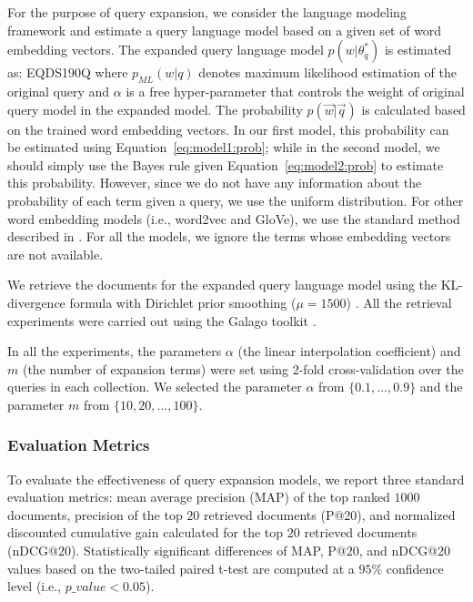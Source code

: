 \documentclass[sigconf]{acmart}
\begin{document}
For the purpose of query expansion, we consider the language modeling framework \cite{Ponte:1998} and estimate a query language model based on a given set of word embedding vectors. The expanded query language model $p(w | \theta^*_q)$ is estimated as:
EQDS190Q
where $p_{ML}(w | q)$ denotes maximum likelihood estimation of the original query and $\alpha$ is a free hyper-parameter that controls the weight of original query model in the expanded model. The probability $p(\vec{w} | \vec{q})$ is calculated based on the trained word embedding vectors. In our first model, this probability can be estimated using {Equation}~\eqref{eq:model1:prob}; while in the second model, we should simply use the Bayes rule given {Equation}~\eqref{eq:model2:prob} to estimate this probability. However, since we do not have any information about the probability of each term given a query, we use the uniform distribution. For other word embedding models (i.e., word2vec and GloVe), we use the standard method described in \cite{Diaz:2016}. For all the models, we ignore the terms whose embedding vectors are not available.

We retrieve the documents for the expanded query language model using the KL-divergence formula \cite{Lafferty:2001} with Dirichlet prior smoothing ($\mu=1500$) \cite{Zhai:2004}. All the retrieval experiments were carried out using the Galago toolkit \cite{Croft:2009}.

In all the experiments, the parameters $\alpha$ (the linear interpolation coefficient) and $m$ (the number of expansion terms) were set using 2-fold cross-validation over the queries in each collection. We selected the parameter $\alpha$ from $\{0.1, \dots, 0.9\}$ and the parameter $m$ from $\{10, 20, ..., 100\}$.

\subsubsection{Evaluation Metrics}
To evaluate the effectiveness of query expansion models, we report three standard evaluation metrics: mean average precision (MAP) of the top ranked $1000$ documents, precision of the top $20$ retrieved documents (P@20), and normalized discounted cumulative gain \cite{Jarvelin:2002} calculated for the top $20$ retrieved documents (nDCG@20). Statistically significant differences of MAP, P@20, and nDCG@20 values based on the two-tailed paired t-test are computed at a $95\%$ confidence level (i.e., $p\_value<0.05$).
 
\end{document}
